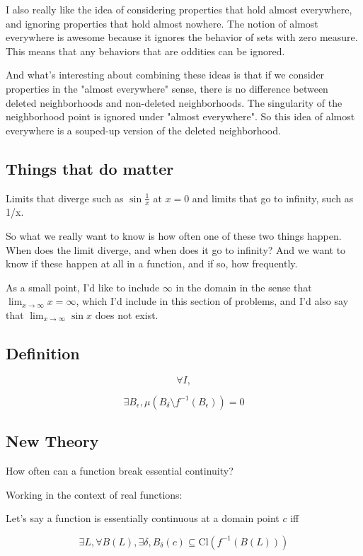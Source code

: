 \documentclass{article}
\begin{document}
I also really like the idea of considering properties that hold almost everywhere, and ignoring properties that hold almost nowhere. The notion of almost everywhere is awesome because it ignores the behavior of sets with zero measure. This means that any behaviors that are oddities can be ignored. 

And what's interesting about combining these ideas is that if we consider properties in the "almost everywhere" sense, there is no difference between deleted neighborhoods and non-deleted neighborhoods. The singularity of the neighborhood point is ignored under "almost everywhere".  So this idea of almost everywhere is a souped-up version of the deleted neighborhood.

\subsection{Things that do matter}
Limits that diverge such as $\sin \frac{1}{x}$ at $x=0$ and limits that go to infinity, such as 1/x. 

So what we really want to know is how often one of these two things happen. When does the limit diverge, and when does it go to infinity? And we want to know if these happen at all in a function, and if so, how frequently. 

As a small point, I'd like to include $\infty$ in the domain in the sense that $\displaystyle \lim_{x \to \infty} x = \infty$, which I'd include in this section of problems, and I'd also say that $\displaystyle \lim_{x \to \infty} \sin x$ does not exist.  

\subsection{Definition}

$$\forall I, $$

$$\exists B_{\epsilon} , \mu(B_{\delta} \setminus f^{-1}(B_\epsilon)) = 0$$

\subsection{New Theory}

How often can a function break essential continuity?

Working in the context of real functions:

Let's say a function is essentially continuous at a domain point $c$ iff

$$\exists L, \forall B(L), \exists \delta, B_\delta (c) \subseteq \textrm{Cl}(f^{-1}(B(L)))$$
\end{document}
